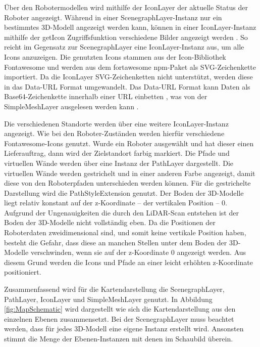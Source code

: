 Über den Robotermodellen wird mithilfe der IconLayer der aktuelle Status der Roboter angezeigt. Während in einer ScenegraphLayer-Instanz nur ein bestimmtes 3D-Modell angezeigt werden kann, können in einer IconLayer-Instanz mithilfe der getIcon Zugriffsfunktion verschiedene Bilder angezeigt werden \cite{DeckglIconLayer}. So reicht im Gegensatz zur ScenegraphLayer eine IconLayer-Instanz aus, um alle Icons anzuzeigen. Die genutzten Icons stammen aus der Icon-Bibliothek Fontawesome und werden aus dem fortawesome \ac{npm}-Paket als \ac{SVG}-Zeichenkette importiert. Da die IconLayer \ac{SVG}-Zeichenketten nicht unterstützt, werden diese in das Data-\ac{URL} Format umgewandelt. Das Data-\ac{URL} Format kann Daten als \gls{Base64}-Zeichenkette innerhalb einer \ac{URL} einbetten \cite{DataUrlSpec}, was von der SimpleMeshLayer ausgelesen werden kann \cite{DeckglIconLayer}.

Die verschiedenen Standorte werden über eine weitere IconLayer-Instanz angezeigt. Wie bei den Roboter-Zuständen werden hierfür verschiedene Fontawesome-Icons genutzt. Wurde ein Roboter ausgewählt und hat dieser einen Lieferauftrag, dann wird der Zielstandort farbig markiert. Die Pfade und virtuellen Wände werden über eine Instanz der PathLayer \cite{DeckglPathLayer} dargestellt. Die virtuellen Wände werden gestrichelt und in einer anderen Farbe angezeigt, damit diese von den Roboterpfaden unterschieden werden können. Für die gestrichelte Darstellung wird die PathStyleExtension \cite{DeckglPathStyleExtension} genutzt. Der Boden der 3D-Modelle liegt relativ konstant auf der z-Koordinate – der vertikalen Position – 0. Aufgrund der Ungenauigkeiten die durch den \ac{LiDAR}-Scan entstehen ist der Boden der 3D-Modelle nicht vollständig eben. Da die Positionen der Roboterdaten zweidimensional sind, und somit keine vertikale Position haben, besteht die Gefahr, dass diese an manchen Stellen unter dem Boden der 3D-Modelle verschwinden, wenn sie auf der z-Koordinate 0 angezeigt werden. Aus diesem Grund werden die Icons und Pfade an einer leicht erhöhten z-Koordinate positioniert.

Zusammenfassend wird für die Kartendarstellung die ScenegraphLayer, PathLayer, IconLayer und SimpleMeshLayer genutzt. In Abbildung \ref{fig:MapSchematic} wird dargestellt wie sich die Kartendarstellung aus den einzelnen Ebenen zusammensetzt. Bei der ScenegraphLayer muss beachtet werden, dass für jedes 3D-Modell eine eigene Instanz erstellt wird. Ansonsten stimmt die Menge der Ebenen-Instanzen mit denen im Schaubild überein.

